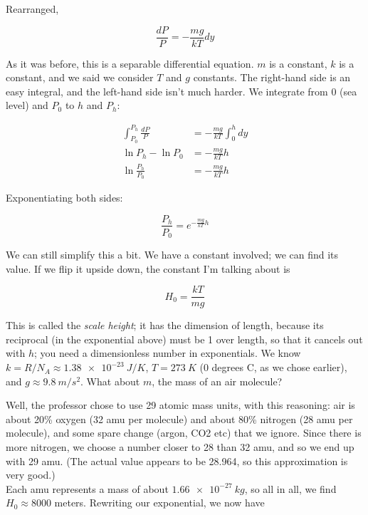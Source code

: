 \documentclass[8.01x]{subfiles}
\begin{document}
Rearranged,

\begin{equation}
\frac{dP}{P}  = - \frac{m g}{k T} dy
\end{equation}

As it was before, this is a separable differential equation. $m$ is a constant, $k$ is a constant, and we said we consider $T$ and $g$ constants. The right-hand side is an easy integral, and the left-hand side isn't much harder. We integrate from $0$ (sea level) and $P_0$ to $h$ and $P_h$:

\begin{align}
\int_{P_0}^{P_h} \frac{dP}{P}  &= - \frac{m g}{k T} \int_0^h dy\\
\ln P_h - \ln P_0  &= - \frac{m g}{k T} h\\
\ln \frac{P_h}{P_0} &= - \frac{m g}{k T} h
\end{align}

Exponentiating both sides:

\begin{equation}
\frac{P_h}{P_0} = e^{- \frac{m g}{k T} h}
\end{equation}

We can still simplify this a bit. We have a constant involved; we can find its value. If we flip it upside down, the constant I'm talking about is

\begin{equation}
H_0 = \frac{k T}{m g}
\end{equation}

This is called the \emph{scale height}; it has the dimension of length, because its reciprocal (in the exponential above) must be 1 over length, so that it cancels out with $h$; you need a dimensionless number in exponentials. We know $k = R/N_A \approx \SI{1.38e-23}{J/K}$, $T = \SI{273}{K}$ (0 degrees C, as we chose earlier), and $g \approx \SI{9.8}{m/s^2}$. What about $m$, the mass of an air molecule?

Well, the professor chose to use 29 atomic mass units, with this reasoning: air is about 20\% oxygen (32 amu per molecule) and about 80\% nitrogen (28 amu per molecule), and some spare change (argon, CO2 etc) that we ignore. Since there is more nitrogen, we choose a number closer to 28 than 32 amu, and so we end up with 29 amu. (The actual value appears to be 28.964, so this approximation is very good.)\\
Each amu represents a mass of about $\SI{1.66e-27}{kg}$, so all in all, we find $H_0 \approx 8000$ meters. Rewriting our exponential, we now have
\end{document}
